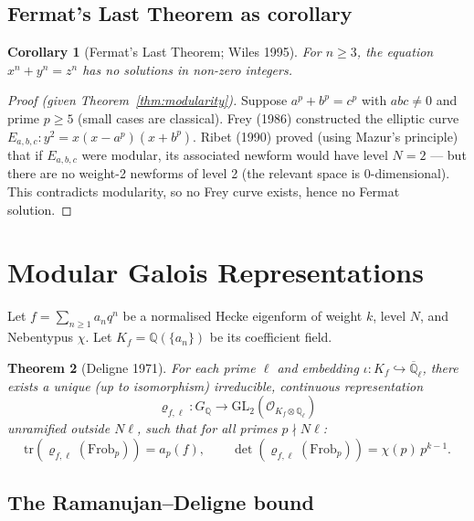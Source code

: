 \documentclass[a4paper,12pt]{amsart}
\newtheorem{theorem}{Theorem}[section]
\newtheorem{corollary}[theorem]{Corollary}
\theoremstyle{definition}
\theoremstyle{remark}
\newcommand{\Q}{\mathbb{Q}}
\newcommand{\Ql}{\mathbb{Q}_\ell}
\newcommand{\GL}{\mathrm{GL}}
\newcommand{\Frob}{\mathrm{Frob}}
\newcommand{\tr}{\mathrm{tr}}
\begin{document}
\subsection{Fermat's Last Theorem as corollary}

\begin{corollary}[Fermat's Last Theorem; Wiles 1995]
For $n \geq 3$, the equation $x^n + y^n = z^n$ has no solutions in non-zero integers.
\end{corollary}

\begin{proof}[Proof (given Theorem~\ref{thm:modularity})]
Suppose $a^p + b^p = c^p$ with $abc \neq 0$ and prime $p \geq 5$ (small cases are classical).
Frey (1986) constructed the elliptic curve $E_{a,b,c}\colon y^2 = x(x-a^p)(x+b^p)$.
Ribet (1990) proved (using Mazur's principle) that if $E_{a,b,c}$ were modular,
its associated newform would have level $N = 2$ --- but there are no weight-2 newforms
of level 2 (the relevant space is 0-dimensional). This contradicts modularity, so no
Frey curve exists, hence no Fermat solution.
\end{proof}

\section{Modular Galois Representations}
\label{sec:modular-forms}

Let $f = \sum_{n \geq 1} a_n q^n$ be a normalised Hecke eigenform of weight $k$,
level $N$, and Nebentypus $\chi$. Let $K_f = \Q(\{a_n\})$ be its coefficient field.

\begin{theorem}[Deligne 1971]
\label{thm:deligne}
For each prime $\ell$ and embedding $\iota\colon K_f \hookrightarrow \overline{\Q}_\ell$,
there exists a unique (up to isomorphism) irreducible, continuous representation
\[
  \varrho_{f,\ell}\colon G_\Q \to \GL_2(\mathcal{O}_{K_f \otimes \Ql})
\]
unramified outside $N\ell$, such that for all primes $p \nmid N\ell$:
\[
  \tr(\varrho_{f,\ell}(\Frob_p)) = a_p(f), \qquad
  \det(\varrho_{f,\ell}(\Frob_p)) = \chi(p)\, p^{k-1}.
\]
\end{theorem}

\subsection{The Ramanujan--Deligne bound}
\end{document}

